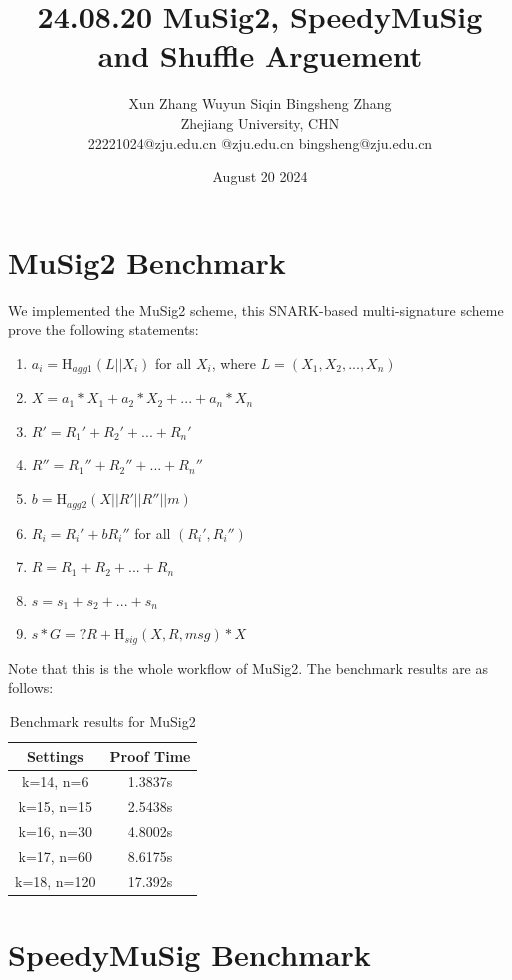 \documentclass{article}
\title{24.08.20 MuSig2, SpeedyMuSig and Shuffle Arguement}
\author{Xun Zhang \quad \quad Wuyun Siqin \quad \quad Bingsheng Zhang \\ 
Zhejiang University, CHN \\
22221024@zju.edu.cn \quad 3210101763@zju.edu.cn \quad bingsheng@zju.edu.cn}
\date{August 20 2024}
\begin{document}
\maketitle

\section{MuSig2 Benchmark}

We implemented the MuSig2 scheme, this SNARK-based multi-signature scheme prove the following statements:
\begin{enumerate}
    \item $a_i = \textrm{H}_{agg1}(L || X_i)$ for all $X_i$, where $L = (X_1, X_2, ... , X_n)$
    \item $X = a_1*X_1 + a_2*X_2 +...+ a_n*X_n$
    \item $R' = R_1' + R_2' +...+ R_n'$
    \item $R'' = R_1'' + R_2'' +...+ R_n''$
    \item $b = \textrm{H}_{agg2}(X||R'||R''||m)$
    \item $R_i = R_i'+bR_i''$ for all $(R_i',R_i'')$
    \item $R = R_1 + R_2 +...+ R_n$
    \item $s = s_1 + s_2 + ... + s_n$
    \item $s*G =? R+\textrm{H}_{sig}(X, R, msg)*X$
\end{enumerate} 

Note that this is the whole workflow of MuSig2. The benchmark results are as follows:

\begin{table}[H]
    \centering
    \begin{tabular}{c|c} \hline
        Settings & Proof Time \\ \hline
        k=14, n=6 & 1.3837s \\ \hline
        k=15, n=15 & 2.5438s \\ \hline
        k=16, n=30 & 4.8002s \\ \hline
        k=17, n=60 & 8.6175s  \\ \hline
        k=18, n=120 & 17.392s \\ \hline
    \end{tabular}
    \caption{Benchmark results for MuSig2}
    \label{tab:version1_agg}
\end{table}

\section{SpeedyMuSig Benchmark}
\end{document}
